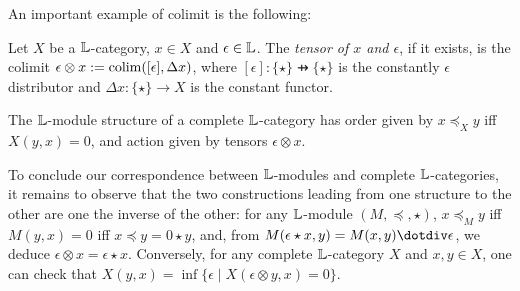 
%

An important example of colimit is the following:\begin{definition}[tensors]
Let $X$ be a $\mathbb{L}$-category, $x\in X$ and $\epsilon \in \mathbb{L}$. The \emph{tensor of $x$ and $\epsilon$}, if it exists, is the colimit $\epsilon \otimes x:= \mathrm{colim}( [\epsilon],\Delta x)$, where
$[\epsilon]: \{\star\}\pfun \{\star\}$ is the constantly $\epsilon$ distributor
and $\Delta x:\{\star\}\to X$ is the constant functor. 
\end{definition}



The $\mathbb{L}$-module structure of a complete $\mathbb{L}$-category has order given by $x\preceq_{X}y $ iff $X(y,x)=0$, and 
action given by tensors $\epsilon \otimes x$. 



To conclude our correspondence between $\mathbb{L}$-modules and complete $\mathbb{L}$-categories, it remains to observe that the 
two constructions leading from one structure to the other are one the inverse of the other: for any $\mathbb{L}$-module $(M,\preceq,\star)$,
$x\preceq_{M}y$ iff $M(y,x)=0$ iff $x\preceq y=0\star y$, and, from  
$M(\epsilon \star x, y)= M(x,y)\dotdiv \epsilon$, we deduce $\epsilon\otimes x=\epsilon \star x$. 
Conversely, 
for any complete $\mathbb{L}$-category $X$ and $x,y\in X$, one can check that 
$X(y,x)=\inf\{ \epsilon \mid X(\epsilon\otimes y,x )=0\}$.

